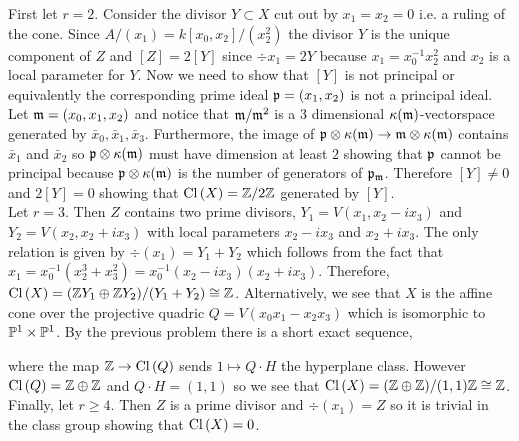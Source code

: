 \documentclass[12pt]{article}
\begin{document}
\begin{enumerate}
First let $r = 2$. Consider the divisor $Y \subset X$ cut out by $x_1 = x_2 = 0$ i.e. a ruling of the cone. Since $A/(x_1) = k[x_0, x_2]/(x_2^2)$ the divisor $Y$ is the unique component of $Z$ and $[Z] = 2 [Y]$ since $\div{x_1} = 2 Y$ because $x_1 = x_0^{-1} x_2^2$ and $x_2$ is a local parameter for $Y$. Now we need to show that $[Y]$ is not principal or equivalently the corresponding prime ideal $\p = (x_1, x_2)$ is not a principal ideal. Let $\m = (x_0, x_1, x_2)$ and notice that $\m / \m^2$ is a 3 dimensional $\kappa(\m)$-vectorspace generated by $\bar{x}_0, \bar{x}_1, \bar{x}_3$. Furthermore, the image of $\p \otimes \kappa(\m) \to \m \otimes \kappa(\m)$ contains $\bar{x}_1$ and $\bar{x}_2$ so $\p \otimes \kappa(\m)$ must have dimension at least $2$ showing that $\p$ cannot be principal because $\p \otimes \kappa(\m)$ is the number of generators of $\p_\m$. Therefore $[Y] \neq 0$ and $2 [Y] = 0$ showing that $\Cl{X} = \Z / 2 \Z$ generated by $[Y]$.
\bigskip\\
Let $r = 3$. Then $Z$ contains two prime divisors, $Y_1 = V(x_1, x_2 - i x_3)$ and $Y_2 = V(x_2, x_2 + i x_3)$ with local parameters $x_2 - i x_3$ and $x_2 + i x_3$. The only relation is given by $\div{(x_1)} = Y_1 + Y_2$ which follows from the fact that $x_1 = x_0^{-1} (x_2^3 + x_3^2) = x_0^{-1} (x_2 - i x_3)(x_2 + i x_3)$. Therefore, $\Cl{X} = (\Z Y_1 \oplus \Z Y_2)/ (Y_1 + Y_2) \cong \Z$. Alternatively, we see that $X$ is the affine cone over the projective quadric $Q = V(x_0 x_1 - x_2 x_3)$ which is isomorphic to $\P^1 \times \P^1$. By the previous problem there is a short exact sequence,
\begin{center}
\end{center}
where the map $\Z \to \Cl{Q}$ sends $1 \mapsto Q \cdot H$ the hyperplane class. However $\Cl{Q} = \Z \oplus \Z$ and $Q \cdot H = (1,1)$ so we see that $\Cl{X} = (\Z \oplus \Z)/(1,1) \Z \cong \Z$.
\bigskip\\
Finally, let $r \ge 4$. Then $Z$ is a prime divisor and $\div{(x_1)} = Z$ so it is trivial in the class group showing that $\Cl{X} = 0$.


\end{enumerate}
\end{document}
